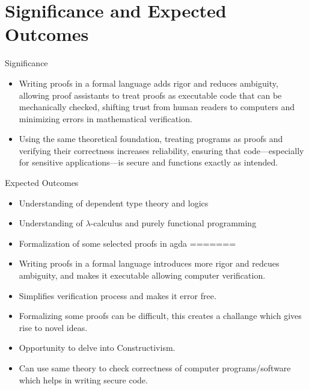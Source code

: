 \documentclass{beamer}
\begin{document}
\section{Significance and Expected Outcomes}
\begin{frame}{Significance}
  \begin{itemize}
<<<<<<< HEAD
    \item Writing proofs in a formal language adds rigor and reduces ambiguity, allowing proof assistants to treat proofs as executable code that can be mechanically checked, shifting trust from human readers to computers and minimizing errors in mathematical verification.

   \item Using the same theoretical foundation, treating programs as proofs and verifying their correctness increases reliability, ensuring that code—especially for sensitive applications—is secure and functions exactly as intended.

  \end{itemize}
\end{frame}
\begin{frame}{Expected Outcomes}
  \begin{itemize}
    \item Understanding of dependent type theory and logics
    \item Understanding of $\lambda$-calculus and purely functional programming
    \item  Formalization of some selected proofs in agda
=======
    \item Writing proofs in a formal language introduces more rigor and redcues ambiguity, and makes it executable allowing computer verification.
    \item Simplifies verification process and makes it error free.
     \item Formalizing some proofs can be difficult, this creates a challange which gives rise to novel ideas.
    \item Opportunity to delve into Constructivism.
    \item Can use same theory to check correctness of computer programs/software which helps in writing secure code. 
  \end{itemize}

\end{frame}
\end{document}

